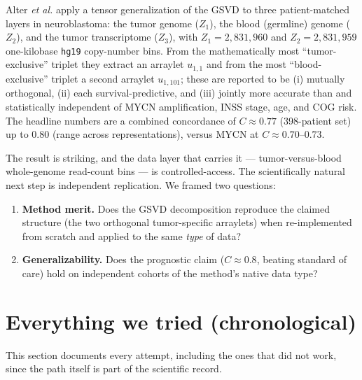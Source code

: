 \documentclass[11pt]{article}
\newcommand{\C}{\textit{C}}
\begin{document}
Alter \emph{et al.} apply a tensor generalization of the GSVD to three
patient-matched layers in neuroblastoma: the tumor genome ($Z_1$), the blood
(germline) genome ($Z_2$), and the tumor transcriptome ($Z_3$), with
$Z_1 = 2{,}831{,}960$ and $Z_2 = 2{,}831{,}959$ one-kilobase \texttt{hg19}
copy-number bins. From the mathematically most ``tumor-exclusive'' triplet they
extract an arraylet $u_{1,1}$ and from the most ``blood-exclusive'' triplet a
second arraylet $u_{1,101}$; these are reported to be (i) mutually orthogonal,
(ii) each survival-predictive, and (iii) jointly more accurate than and
statistically independent of MYCN amplification, INSS stage, age, and COG risk.
The headline numbers are a combined concordance of $\C\approx0.77$ (398-patient
set) up to $0.80$ (range across representations), versus MYCN at
$\C\approx0.70$--$0.73$.

The result is striking, and the data layer that carries it --- tumor-versus-blood
whole-genome read-count bins --- is controlled-access. The scientifically natural
next step is independent replication. We framed two questions:

\begin{enumerate}[leftmargin=1.4em]
  \item \textbf{Method merit.} Does the GSVD decomposition reproduce the
  claimed structure (the two orthogonal tumor-specific arraylets) when
  re-implemented from scratch and applied to the same \emph{type} of data?
  \item \textbf{Generalizability.} Does the prognostic claim
  ($\C\approx0.8$, beating standard of care) hold on independent cohorts of the
  method's native data type?
\end{enumerate}

\section{Everything we tried (chronological)}

This section documents every attempt, including the ones that did not work, since
the path itself is part of the scientific record.
\end{document}
